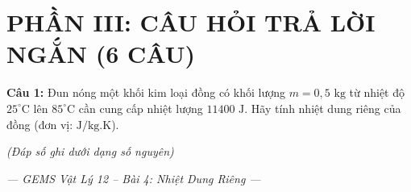 \documentclass[12pt,a4paper]{article}
\begin{document}
\section*{PHẦN III: CÂU HỎI TRẢ LỜI NGẮN (6 CÂU)}

\textbf{Câu 1:} Đun nóng một khối kim loại đồng có khối lượng $m = 0{,}5\text{ kg}$ từ nhiệt độ $25^{\circ}\text{C}$ lên $85^{\circ}\text{C}$ cần cung cấp nhiệt lượng $11400\text{ J}$. Hãy tính nhiệt dung riêng của đồng (đơn vị: $\text{J/kg.K}$).

\textit{(Đáp số ghi dưới dạng số nguyên)}

\vfill
\begin{center}
\textit{--- GEMS Vật Lý 12 -- Bài 4: Nhiệt Dung Riêng ---}
\end{center}
\end{document}
